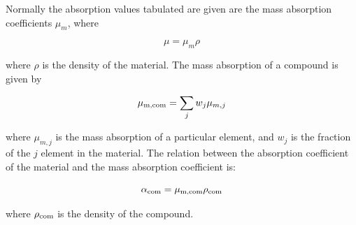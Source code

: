 \begin{flushleft}
Normally the absorption values tabulated are given are the mass absorption coefficients $\mu_m$, where
\end{flushleft}

\begin{equation}
\mu = \mu_m \rho
\label{eq: alpha2}
\end{equation}

\begin{flushleft}
where $\rho $ is the density of the material. The mass absorption of a compound is given by
\end{flushleft}

\begin{equation}
\mu \textsubscript{m,com} = \sum_{j} w_j \mu_{m,j}
\label{eq: mu_com}
\end{equation}

\begin{flushleft}
where $\mu_{m,j} $ is the mass absorption of a particular element, and $w_j $ is the fraction of the $j $ element in the material. The relation between the absorption coefficient of the material and the mass absorption coefficient is:
\end{flushleft}

\begin{equation}
\alpha \textsubscript{com} = \mu \textsubscript{m,com} \rho \textsubscript{com}
\label{eq: alpha com}
\end{equation}

\begin{flushleft}
where $\rho \textsubscript{com}$ is the density of the compound.
\end{flushleft}

